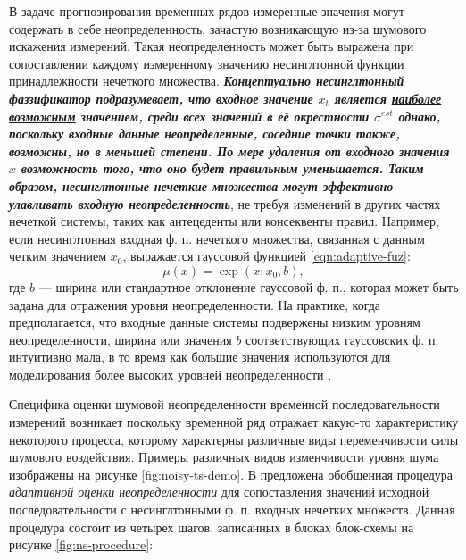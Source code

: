 В задаче прогнозирования временных рядов измеренные значения могут содержать в себе неопределенность, зачастую возникающую из-за шумового искажения измерений. Такая неопределенность может быть выражена при сопоставлении каждому измеренному значению несинглтонной функции принадлежности нечеткого множества. \textbf{\textit{Концептуально несинглтонный фаззификатор подразумевает, что входное значение $x_t$ является \underline{наиболее возможным} значением, среди всех значений в её окрестности $\sigma^{est}$ однако, поскольку входные данные неопределенные, соседние точки также, возможны, но в меньшей степени.
По мере удаления от входного значения $x$ возможность того, что оно будет правильным уменьшается. Таким образом, несинглтонные нечеткие множества могут эффективно улавливать входную неопределенность}}, не требуя изменений в других частях нечеткой системы, таких как антецеденты или консеквенты правил. Например, если несинглтонная входная ф. п. нечеткого множества, связанная с данным четким значением $x_0$, выражается гауссовой функцией \eqref{eqn:adaptive-fuz}:
\begin{equation}
	\label{eqn:adaptive-fuz}
	\mu(x) = \exp \left(x; x_0, b\right),
\end{equation}
где $b$ --- ширина или стандартное отклонение гауссовой ф. п., которая может быть задана для отражения уровня неопределенности. На практике, когда предполагается, что входные данные системы подвержены низким уровням неопределенности, ширина или значения $b$ соответствующих гауссовских ф. п. интуитивно мала, в то время как большие значения используются для моделирования более высоких уровней неопределенности \cite{Pourabdollah2017, Pekaslan2020}.

Специфика оценки шумовой неопределенности временной последовательности измерений возникает поскольку временной ряд отражает какую-то характеристику некоторого процесса, которому характерны различные виды переменчивости силы шумового воздействия. Примеры различных видов изменчивости уровня шума изображены на рисунке \cref{fig:noisy-ts-demo}. В \cite{Pekaslan2020} предложена обобщенная процедура \textit{адаптивной оценки неопределенности} для сопоставления значений исходной последовательности с несинглтонными ф. п. входных нечетких множеств. Данная процедура состоит из четырех шагов, записанных в блоках блок-схемы на рисунке \cref{fig:ns-procedure}:

\FloatBarrier


